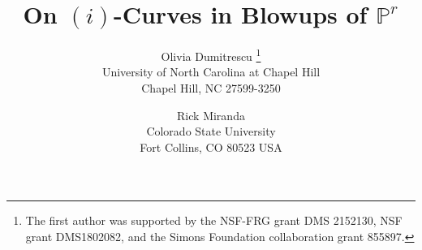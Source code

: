 \documentclass[12pt]{article}
\numberwithin{equation}{section}
\numberwithin{subeq}{equation}
\def\bbP{\mathbb{P}}
\begin{document}
\title{On $(i)$-Curves in Blowups of $\bbP^r$}



\author{
Olivia Dumitrescu \thanks{The first author was supported by the NSF-FRG grant DMS 2152130, NSF grant DMS1802082, and the Simons Foundation collaboration grant 855897.} \\
\small University of North Carolina at Chapel Hill \\ \small Chapel Hill, NC 27599-3250 \\
\and
Rick Miranda \\
\small Colorado State University \\ \small Fort Collins, CO 80523 USA}

\maketitle
\end{document}
